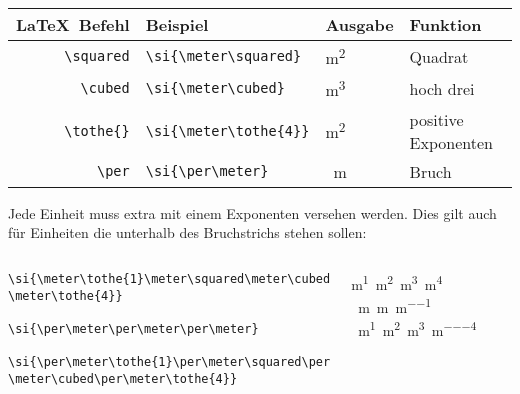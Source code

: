 \documentclass["WS\space 16-17\space -\space LaTeX-Kurs\space -\space Praesentation\space -\space 3.tex"]{subfiles}
\begin{document}
\begin{frame}[fragile]
	\begin{center}
		\begin{tabular}{r|ll|l}
			\toprule
			\LaTeX\ Befehl				& Beispiel		&Ausgabe	&	Funktion								\\ \midrule
			\lstinline|\squared|	&	\lstinline|\si{\meter\squared}| &\si{\meter\squared}			&	Quadrat 				\\
						\lstinline|\cubed|	&	\lstinline|\si{\meter\cubed}| &\si{\meter\cubed}			&	hoch drei				\\
			\lstinline/\tothe{}/			&	\lstinline|\si{\meter\tothe{4}}|	& \si{\meter\tothe{2}}				&	 positive Exponenten					\\
			\lstinline/\per/			&	\lstinline|\si{\per\meter}|& \si{\per\meter}				&	 	Bruch			\\
			\bottomrule
		\end{tabular}
	\end{center}
Jede Einheit muss extra mit einem Exponenten versehen werden. Dies gilt auch für Einheiten die unterhalb des Bruchstrichs stehen sollen:
	\vspace{12px}
\begin{columns}[c]
\begin{lstlisting}
\si{\meter\tothe{1}\meter\squared\meter\cubed
\meter\tothe{4}}

\si{\per\meter\per\meter\per\meter}

\si{\per\meter\tothe{1}\per\meter\squared\per
\meter\cubed\per\meter\tothe{4}}
\end{lstlisting}
\begin{outputbox}
	\begin{center}
		\vspace{3px}
\si{\meter\tothe{1}\meter\squared\meter\cubed\meter\tothe{4}} \\
\vspace{10px}
\si{\per\meter\per\meter\per\meter} \\
\vspace{10px}
\si{\per\meter\tothe{1}\per\meter\squared\per\meter\cubed\per\meter\tothe{4}}
	\end{center}
\end{outputbox}
\end{columns}
\end{frame}
\end{document}
